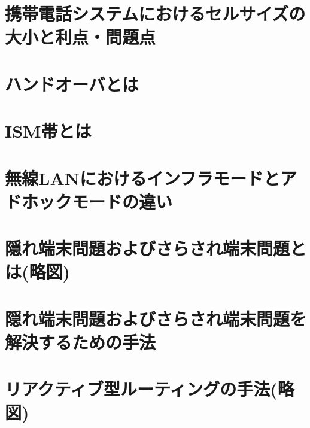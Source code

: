 \documentclass[10.5pt]{jsarticle}
\begin{document}
\section{携帯電話システムにおけるセルサイズの大小と利点・問題点}


\section{ハンドオーバとは}


\section{ISM帯とは}


\section{無線LANにおけるインフラモードとアドホックモードの違い}


\section{隠れ端末問題およびさらされ端末問題とは(略図)}


\section{隠れ端末問題およびさらされ端末問題を解決するための手法}


\section{リアクティブ型ルーティングの手法(略図)}
\end{document}
